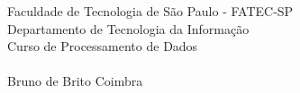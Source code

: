 \thispagestyle{empty}
\begin{center}
\large Faculdade de Tecnologia de São Paulo - FATEC-SP \\
\large Departamento de Tecnologia da Informação \\
\large Curso de Processamento de Dados \\
\vspace{8cm}
\TITLE \\
\vspace{9cm}
\large Bruno de Brito Coimbra
\end{center}

